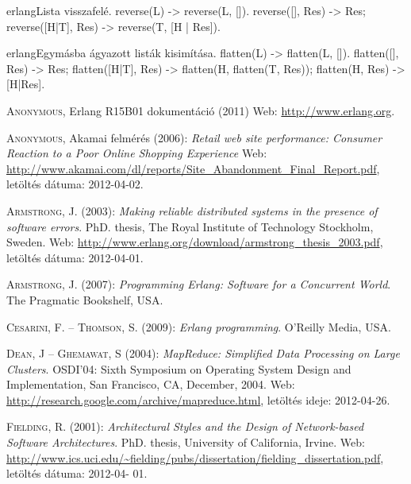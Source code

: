 \documentclass[12pt, a4paper, oneside]{book}
\begin{document}
\begin{code}{erlang}{Lista visszafelé.}
reverse(L) ->
  reverse(L, []).
reverse([], Res) ->
  Res;
reverse([H|T], Res) ->
  reverse(T, [H | Res]).
\end{code}

\newpage
\begin{code}{erlang}{Egymásba ágyazott listák kisimítása.}
flatten(L) -> flatten(L, []).
flatten([], Res) -> Res;
flatten([H|T], Res) ->
  flatten(H, flatten(T, Res));
flatten(H, Res) ->
  [H|Res].
\end{code}

\begin{thebibliography}{9}

{\scshape Anonymous}, Erlang R15B01 dokumentáció (2011) Web:
\url{http://www.erlang.org}.

{\scshape Anonymous}, Akamai felmérés (2006): \emph{Retail web site performance: Consumer Reaction to a Poor Online
Shopping Experience} Web:
\url{http://www.akamai.com/dl/reports/Site_Abandonment_Final_Report.pdf},
letöltés dátuma: 2012-04-02.

{\scshape Armstrong, J.} (2003): \emph{Making reliable distributed systems in the presence of software errors}. PhD.
thesis, The Royal Institute of Technology Stockholm, Sweden. Web:
\url{http://www.erlang.org/download/armstrong_thesis_2003.pdf}, letöltés
dátuma: 2012-04-01.

{\scshape Armstrong, J.} (2007): \emph{Programming Erlang: Software for a Concurrent World}. The Pragmatic
Bookshelf, USA.

{\scshape Cesarini, F. -- Thomson, S.} (2009): \emph{Erlang programming}.
O'Reilly Media, USA.

{\scshape Dean, J -- Ghemawat, S} (2004): \emph{MapReduce: Simplified Data
Processing on Large Clusters}. OSDI'04: Sixth Symposium on Operating System
Design and Implementation, San Francisco, CA, December, 2004. Web:
\url{http://research.google.com/archive/mapreduce.html}, letöltés ideje: 2012-04-26.

{\scshape Fielding, R.} (2001): \emph{Architectural Styles and the Design of Network-based Software
Architectures}. PhD. thesis, University of California, Irvine. Web:
\url{http://www.ics.uci.edu/~fielding/pubs/dissertation/fielding_dissertation.pdf}, letöltés dátuma: 2012-04-
01.


\end{thebibliography}
\end{document}
